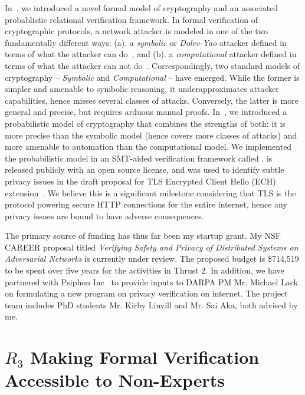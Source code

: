  In~\cite{waldo-oopsla23}, we introduced
a novel formal model of cryptography and an associated probablistic
relational verification framework. In formal verification of cryptographic
protocols, a network attacker is modeled in one of the two fundamentally
different ways: (a). a \emph{symbolic} or \emph{Dolev-Yao} attacker defined
in terms of what the attacker can do~\cite{dolev-yao}, and (b). a
\emph{computational} attacker defined in terms of what the attacker can not
do~\cite{blanchet-tr23, bellare-eurocrypt06}. Correspondingly, two standard
models of cryptography -- \emph{Symbolic} and \emph{Computational} -- have
emerged. While the former is simpler and amenable to symbolic reasoning, it
underapproximates attacker capabilities, hence misses several classes of
attacks. Conversely, the latter is more general and precise, but requires
arduous manual proofs. In~\cite{waldo-oopsla23}, we introduced a
probabilistic model of cryptography that combines the strengths of both: it
is more precise than the symbolic model (hence covers more classes of
attacks) and more amenable to automation than the computational model. We
implemented the probabilistic model in an SMT-aided verification framework
called \waldo. \waldo is released publicly with an open source license, and
was used to identify subtle privacy issues in the draft proposal for TLS
Encrypted Client Hello (ECH) extension~\cite{ech-draft}. We believe this is
a significant milestone considering that TLS is the protocol powering
secure HTTP connections for the entire internet, hence any privacy issues
are bound to have adverse consequences. 

 The primary source of funding has
thus far been my startup grant. My NSF CAREER proposal titled
\emph{Verifying Safety and Privacy of Distributed Systems on Adversarial
Networks} is currently under review. The proposed budget is \$714,519 to be
spent over five years for the activities in Thrust 2. In addition, we have
partnered with Psiphon Inc~\cite{psiphon} to provide inputs to DARPA PM Mr.
Michael Lack on formulating a new program on privacy verification on
internet. The project team includes PhD students Mr. Kirby Linvill and Mr.
Sai Aka, both advised by me. 

\section*{$R_3$ Making Formal Verification Accessible to Non-Experts}

